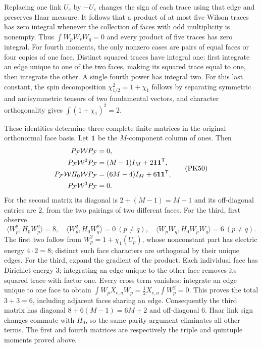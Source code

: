 \documentclass[11pt]{article}
\begin{document}
Replacing one link \(U_e\) by \(-U_e\) changes the sign of each trace using
that edge and preserves Haar measure. It follows that a product of at most
five Wilson traces has zero integral whenever the collection of faces with
odd multiplicity is nonempty. Thus
\(\int W_pW_rW_q=0\) and every product of five traces has zero integral.
For fourth moments, the only nonzero cases are pairs of equal faces or four
copies of one face. Distinct squared traces have integral one: first
integrate an edge unique to one of the two faces, making its squared trace
equal to one, then integrate the other. A single fourth power has integral
two. For this last constant, the spin decomposition
\(\chi_{1/2}^2=1+\chi_1\) follows by separating symmetric and antisymmetric
tensors of two fundamental vectors, and character orthogonality gives
\(\int(1+\chi_1)^2=2\).

These identities determine three complete finite matrices in the original
orthonormal face basis. Let \({\bf 1}\) be the \(M\)-component column of ones.
Then
\[
 \begin{aligned}
 P_{\mathcal F}\mathcal W P_{\mathcal F}&=0,\\
 P_{\mathcal F}\mathcal W^2 P_{\mathcal F}
   &=(M-1)I_M+2{\bf1}{\bf1}^{\mathsf T},\\
 P_{\mathcal F}\mathcal W H_0\mathcal W P_{\mathcal F}
   &=(6M-4)I_M+6{\bf1}{\bf1}^{\mathsf T},\\
 P_{\mathcal F}\mathcal W^3 P_{\mathcal F}&=0.
 \end{aligned}\tag{PK50}
\]
For the second matrix its diagonal is \(2+(M-1)=M+1\) and its off-diagonal
entries are \(2\), from the two pairings of two different faces. For the
third, first observe
\[
 \langle W_p^2,H_0W_p^2\rangle=8,\quad
 \langle W_p^2,H_0W_q^2\rangle=0\ (p\ne q),\quad
 \langle W_pW_q,H_0W_pW_q\rangle=6\ (p\ne q).
\]
The first two follow from \(W_p^2=1+\chi_1(U_p)\), whose nonconstant
part has electric energy \(4\cdot2=8\); distinct such face characters
are orthogonal by their unique edges. For the third, expand the gradient
of the product. Each individual face has Dirichlet energy \(3\);
integrating an edge unique to the other face removes its squared trace
with factor one. Every cross term vanishes: integrate an edge unique to
one face to obtain
\(\int W_p X_{e,a}W_p= \tfrac12X_{e,a}\int W_p^2=0\).
This proves the total \(3+3=6\), including adjacent faces sharing an edge.
Consequently the third matrix has diagonal \(8+6(M-1)=6M+2\) and
off-diagonal \(6\). Haar link sign changes commute with \(H_0\), so the
same parity argument eliminates all other terms. The first and fourth
matrices are respectively the triple and quintuple moments proved above.
\end{document}
